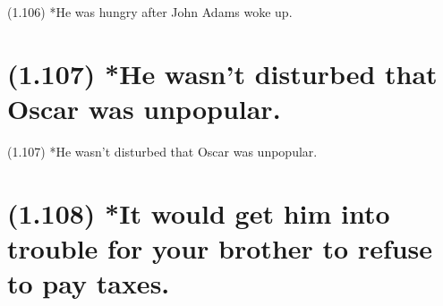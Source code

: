 \documentclass{article}
\begin{document}
\bigbreak
\begin{enumerate*}
\item[(1.106)] *He was hungry after John Adams woke up.
\end{enumerate*}
\bigbreak

\bigbreak
\begin{minipage}{\textwidth}
\end{minipage}
\bigbreak

\clearpage

%
%

\section*{(1.107) *He wasn't disturbed that Oscar was unpopular.}

\bigbreak
\begin{enumerate*}
\item[(1.107)] *He wasn't disturbed that Oscar was unpopular.
\end{enumerate*}
\bigbreak

\bigbreak
\begin{minipage}{\textwidth}
\end{minipage}
\bigbreak

\clearpage

%
%

\section*{(1.108) *It would get him into trouble for your brother to refuse to pay taxes.}
\end{document}
